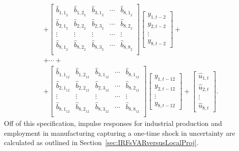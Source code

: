 \documentclass[a4paper,11pt,listof=nochaptergap,oneside,pointednumbers,bibtotoc,bigheadings,liststotoc]{scrbook}
\theoremstyle{mysatz}
\theoremstyle{mydefinition}
\theoremstyle{mybemerkung}
\let\oldhat\hat
\newcommand{\hattnobf}[1]{\oldhat{#1}}
\begin{document}
\begin{itemize}
\begin{enumerate}
\begin{equation}
\begin{split}
		& +
		\begin{bmatrix}
    		\hattnobf{b}_{{1,1}_2} & \hattnobf{b}_{{1,2}_2} & \hattnobf{b}_{{3,1}_2} & \cdots & \hattnobf{b}_{{8,1}_2}\\
    		\hattnobf{b}_{{2,1}_2} & \hattnobf{b}_{{2,2}_2} & \hattnobf{b}_{{2,3}_2} & \cdots & \hattnobf{b}_{{8,2}_2}\\
		\vdots & \vdots & \vdots & \cdots & \vdots \\
		\hattnobf{b}_{{8,1}_2} & \hattnobf{b}_{{8,2}_2} & \hattnobf{b}_{{8,3}_2} & \cdots & \hattnobf{b}_{{8,8}_2}\\
 		\end{bmatrix} 
		\begin{bmatrix}
    		y_{1,t-2} \\
    		y_{2,t-2} \\
		\vdots \\
		y_{8, t-2}
 		\end{bmatrix} +\\
		& + \cdots + \\
		& + 
		\begin{bmatrix}
    		\hattnobf{b}_{{1,1}_{12}} & \hattnobf{b}_{{1,2}_{12}} & \hattnobf{b}_{{3,1}_{12}} & \cdots & \hattnobf{b}_{{8,1}_{12}}\\
    		\hattnobf{b}_{{2,1}_{12}} & \hattnobf{b}_{{2,2}_{12}} & \hattnobf{b}_{{2,3}_{12}} & \cdots & \hattnobf{b}_{{8,2}_{12}}\\
		\vdots & \vdots & \vdots & \cdots & \vdots \\
		\hattnobf{b}_{{8,1}_{12}} & \hattnobf{b}_{{8,2}_{12}} & \hattnobf{b}_{{8,3}_{12}} & \cdots & \hattnobf{b}_{{8,8}_{12}}\\
 		\end{bmatrix} 
		\begin{bmatrix}
    		y_{1,t-12} \\
    		y_{2,t-12} \\
		\vdots \\
		y_{8, t-12}
 		\end{bmatrix}  + 
		\begin{bmatrix}
    		\hattnobf{u}_{1, t} \\
    		\hattnobf{u}_{2, t} \\
		\vdots \\
		\hattnobf{u}_{8, t}
 		\end{bmatrix}. 
	\end{split}								
	\end{equation}	
Off of this specification, impulse responses for industrial production and employment in manufacturing capturing a one-time shock in uncertainty are calculated as outlined in Section~\ref{sec:IRFsVARversusLocalProj}.


\end{enumerate}
\end{itemize}
\end{document}
